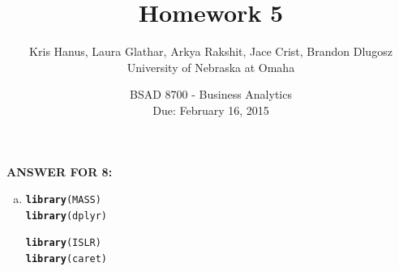 \documentclass{article}\usepackage[]{graphicx}\usepackage[]{color}
\makeatletter
\newcommand{\hlstd}[1]{\textcolor[rgb]{0.345,0.345,0.345}{#1}}%
\newcommand{\hlkwd}[1]{\textcolor[rgb]{0.737,0.353,0.396}{\textbf{#1}}}%
\newenvironment{kframe}{%
 \def\at@end@of@kframe{}%
 \ifinner\ifhmode%
  \def\at@end@of@kframe{\end{minipage}}%
  \begin{minipage}{\columnwidth}%
 \fi\fi%
 \def\FrameCommand##1{\hskip\@totalleftmargin \hskip-\fboxsep
 \colorbox{shadecolor}{##1}\hskip-\fboxsep
     \hskip-\linewidth \hskip-\@totalleftmargin \hskip\columnwidth}%
 \MakeFramed {\advance\hsize-\width
   \@totalleftmargin\z@ \linewidth\hsize
   \@setminipage}}%
 {\par\unskip\endMakeFramed%
 \at@end@of@kframe}
\newenvironment{knitrout}{}{} %
\makeatother
\begin{document}
\title{Homework 5}
\date{BSAD 8700 - Business Analytics\\ Due: February 16, 2015}
\author{Kris Hanus, Laura Glathar, Arkya Rakshit, Jace Crist, Brandon Dlugosz\\ University of Nebraska at Omaha}
\maketitle

\textbf{ANSWER FOR 8:} \\

\begin{enumerate}[(a)]
\item
\begin{knitrout}
\color{fgcolor}\begin{kframe}
\begin{alltt}
\hlkwd{library}\hlstd{(MASS)}
\hlkwd{library}\hlstd{(dplyr)}
\end{alltt}


{\ttfamily\noindent\itshape\color{messagecolor}{\#\# \\\#\# Attaching package: 'dplyr'\\\#\# \\\#\# The following object is masked from 'package:MASS':\\\#\# \\\#\#\ \ \ \  select\\\#\# \\\#\# The following object is masked from 'package:stats':\\\#\# \\\#\#\ \ \ \  filter\\\#\# \\\#\# The following objects are masked from 'package:base':\\\#\# \\\#\#\ \ \ \  intersect, setdiff, setequal, union}}\begin{alltt}
\hlkwd{library}\hlstd{(ISLR)}
\hlkwd{library}\hlstd{(caret)}
\end{alltt}



\end{kframe}
\end{knitrout}
\end{enumerate}
\end{document}
